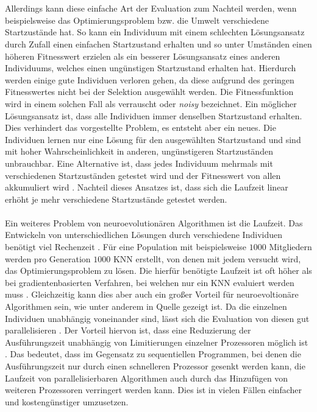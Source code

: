 \\\\
Allerdings kann diese einfache Art der Evaluation zum Nachteil werden, wenn beispielsweise das Optimierungsproblem bzw. die Umwelt verschiedene Startzustände hat. So kann ein Individuum mit einem schlechten Lösungsansatz durch Zufall einen einfachen Startzustand erhalten und so unter Umständen einen höheren Fitnesswert erzielen als ein besserer Lösungsansatz eines anderen Individuums, welches einen ungünstigen Startzustand erhalten hat. Hierdurch werden einige gute Individuen verloren gehen, da diese aufgrund des geringen Fitnesswertes nicht bei der Selektion ausgewählt werden. Die Fitnessfunktion wird in einem solchen Fall als verrauscht oder \emph{noisy} bezeichnet. Ein möglicher Lösungsansatz ist, dass alle Individuen immer denselben Startzustand erhalten. Dies verhindert das vorgestellte Problem, es entsteht aber ein neues. Die Individuen lernen nur eine Lösung für den ausgewählten Startzustand und sind mit hoher Wahrscheinlichkeit in anderen, ungünstigeren Startzuständen unbrauchbar. Eine Alternative ist, dass jedes Individuum mehrmals mit verschiedenen Startzuständen getestet wird und der Fitnesswert von allen akkumuliert wird \cite{whitley1993genetic}. Nachteil dieses Ansatzes ist, dass sich die Laufzeit linear erhöht je mehr verschiedene Startzustände getestet werden.
\\\\
Ein weiteres Problem von neuroevolutionären Algorithmen ist die Laufzeit. Das Entwickeln von unterschiedlichen Lösungen durch verschiedene Individuen benötigt viel Rechenzeit \cite{rojas1996neural}. Für eine Population mit beispielsweise $1000$ Mitgliedern werden pro Generation $1000$ \ac{KNN} erstellt, von denen mit jedem versucht wird, das Optimierungsproblem zu lösen. Die hierfür benötigte Laufzeit ist oft höher als bei gradientenbasierten Verfahren, bei welchen nur ein \ac{KNN} evaluiert werden muss \cite{whitley1993genetic}. Gleichzeitig kann dies aber auch ein großer Vorteil für neuroevoltionäre Algorithmen sein, wie unter anderem in Quelle \cite{such2017deep} gezeigt ist. Da die einzelnen Individuen unabhängig voneinander sind, lässt sich die Evaluation von diesen gut parallelisieren \cite{rojas1996neural}. Der Vorteil hiervon ist, dass eine Reduzierung der Ausführungszeit unabhängig von Limitierungen einzelner Prozessoren möglich ist \cite{schleuter1991explicit}. Das bedeutet, dass im Gegensatz zu sequentiellen Programmen, bei denen die Ausführungszeit nur durch einen schnelleren Prozessor gesenkt werden kann, die Laufzeit von parallelisierbaren Algorithmen auch durch das Hinzufügen von weiteren Prozessoren verringert werden kann. Dies ist in vielen Fällen einfacher und kostengünstiger umzusetzen.
